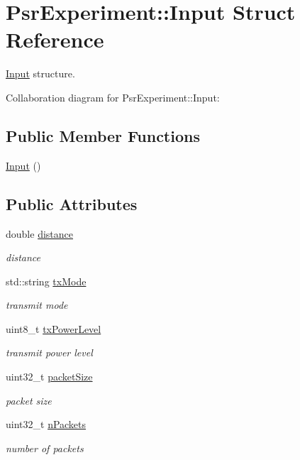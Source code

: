 \hypertarget{structPsrExperiment_1_1Input}{}\section{Psr\+Experiment\+:\+:Input Struct Reference}
\label{structPsrExperiment_1_1Input}


\hyperlink{structPsrExperiment_1_1Input}{Input} structure.  




Collaboration diagram for Psr\+Experiment\+:\+:Input\+:
\subsection*{Public Member Functions}
\begin{DoxyCompactItemize}
\item 
\hyperlink{structPsrExperiment_1_1Input_acbebd944b7fcdcd4772da407c95c6cfd}{Input} ()
\end{DoxyCompactItemize}
\subsection*{Public Attributes}
\begin{DoxyCompactItemize}
\item 
double \hyperlink{structPsrExperiment_1_1Input_a74721efa5a648bbae3524197abccb5dd}{distance}
\begin{DoxyCompactList}\small\item\em distance \end{DoxyCompactList}\item 
std\+::string \hyperlink{structPsrExperiment_1_1Input_a2d2c2e64976db022d21b26e8c0897846}{tx\+Mode}
\begin{DoxyCompactList}\small\item\em transmit mode \end{DoxyCompactList}\item 
uint8\+\_\+t \hyperlink{structPsrExperiment_1_1Input_ac1d2b3dc5b6b3291a888af9aef549e86}{tx\+Power\+Level}
\begin{DoxyCompactList}\small\item\em transmit power level \end{DoxyCompactList}\item 
uint32\+\_\+t \hyperlink{structPsrExperiment_1_1Input_ae43b0fd5bf26ec81497ee109183ec771}{packet\+Size}
\begin{DoxyCompactList}\small\item\em packet size \end{DoxyCompactList}\item 
uint32\+\_\+t \hyperlink{structPsrExperiment_1_1Input_a0cc62b12bc4eef09883bcd12414fc09b}{n\+Packets}
\begin{DoxyCompactList}\small\item\em number of packets \end{DoxyCompactList}\end{DoxyCompactItemize}


